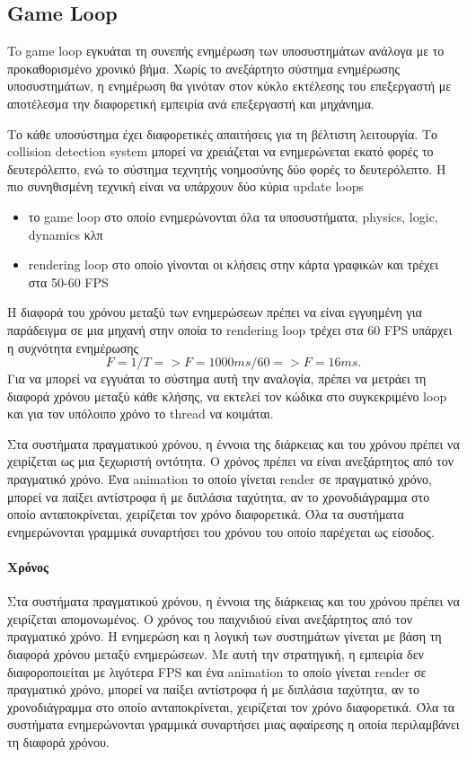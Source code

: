 	\subsection{Game Loop}
	To game loop εγκυάται τη συνεπής ενημέρωση των υποσυστημάτων ανάλογα με το προκαθορισμένο χρονικό βήμα. Χωρίς το ανεξάρτητο σύστημα ενημέρωσης υποσυστημάτων, η ενημέρωση θα γινόταν στον κύκλο εκτέλεσης του επεξεργαστή με αποτέλεσμα την διαφορετική εμπειρία ανά επεξεργαστή και μηχάνημα.
	
	Το κάθε υποσύστημα έχει διαφορετικές απαιτήσεις για τη βέλτιστη λειτουργία. Το collision detection system μπορεί να χρειάζεται να ενημερώνεται εκατό φορές το δευτερόλεπτο, ενώ το σύστημα τεχνητής νοημοσύνης δύο φορές το δευτερόλεπτο. Η πιο συνηθισμένη τεχνική είναι να υπάρχουν δύο κύρια update loops
	\begin{itemize}
	\item το game loop στο οποίο ενημερώνονται όλα τα υποσυστήματα, physics, logic, dynamics κλπ
	\item rendering loop στο οποίο γίνονται οι κλήσεις στην κάρτα γραφικών και τρέχει στα 50-60 \gls{FPS}
	\end{itemize}
	
	Η διαφορά του χρόνου μεταξύ των ενημερώσεων πρέπει να είναι εγγυημένη για παράδειγμα σε μια μηχανή στην οποία το rendering loop τρέχει στα 60 \gls{FPS} υπάρχει η συχνότητα ενημέρωσης
	\begin{equation}
	 F = 1/T =>  F = 1000ms/60 => F = 16ms. 
	\end{equation}Για να μπορεί να εγγυάται το σύστημα αυτή την αναλογία, πρέπει να μετράει τη διαφορά χρόνου μεταξύ κάθε κλήσης, να εκτελεί τον κώδικα στο συγκεκριμένο loop και για τον υπόλοιπο χρόνο το thread να κοιμάται.
	
	Στα συστήματα πραγματικού χρόνου, η έννοια της διάρκειας και του χρόνου πρέπει να χειρίζεται ως μια ξεχωριστή οντότητα. Ο χρόνος πρέπει να είναι ανεξάρτητος από τον πραγματικό χρόνο. Ένα animation το οποίο γίνεται render σε πραγματικό χρόνο, μπορεί να παίξει αντίστροφα ή με διπλάσια ταχύτητα, αν το χρονοδιάγραμμα στο οποίο ανταποκρίνεται, χειρίζεται τον χρόνο διαφορετικά.
	Όλα τα συστήματα ενημερώνονται γραμμικά συναρτήσει του χρόνου του οποίο παρέχεται ως είσοδος.
	
	\paragraph{Χρόνος}
	Στα συστήματα πραγματικού χρόνου, η έννοια της διάρκειας και του χρόνου πρέπει να χειρίζεται απομονωμένος. Ο χρόνος του παιχνιδιού  είναι ανεξάρτητος από τον πραγματικό χρόνο. Η ενημερώση και η λογική των συστημάτων γίνεται με βάση τη διαφορά χρόνου μεταξύ ενημερώσεων. Με αυτή την στρατηγική, η εμπειρία δεν διαφοροποιείται με λιγότερα \gls{FPS} και ένα animation το οποίο γίνεται render σε πραγματικό χρόνο, μπορεί να παίξει αντίστροφα ή με διπλάσια ταχύτητα, αν το χρονοδιάγραμμα στο οποίο ανταποκρίνεται, χειρίζεται τον χρόνο διαφορετικά.
	Όλα τα συστήματα ενημερώνονται γραμμικά συναρτήσει μιας αφαίρεσης η οποία περιλαμβάνει τη διαφορά χρόνου.

